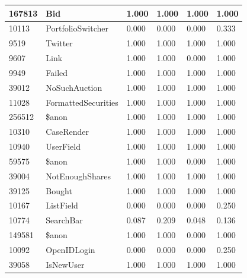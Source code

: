 \documentclass[a4paper]{article}
\newlength{\DUtablewidth} %
\begin{document}
\begin{longtable*}[c]{|p{0.160\DUtablewidth}|p{0.160\DUtablewidth}|p{0.160\DUtablewidth}|p{0.160\DUtablewidth}|p{0.160\DUtablewidth}|p{0.160\DUtablewidth}|}
167813
 & 
Bid
 & 
1.000
 & 
1.000
 & 
1.000
 & 
1.000
 \\
\hline

10113
 & 
PortfolioSwitcher
 & 
0.000
 & 
0.000
 & 
0.000
 & 
0.333
 \\
\hline

9519
 & 
Twitter
 & 
1.000
 & 
1.000
 & 
1.000
 & 
1.000
 \\
\hline

9607
 & 
Link
 & 
1.000
 & 
1.000
 & 
0.000
 & 
1.000
 \\
\hline

9949
 & 
Failed
 & 
1.000
 & 
1.000
 & 
1.000
 & 
1.000
 \\
\hline

39012
 & 
NoSuchAuction
 & 
1.000
 & 
1.000
 & 
1.000
 & 
1.000
 \\
\hline

11028
 & 
FormattedSecurities
 & 
1.000
 & 
1.000
 & 
1.000
 & 
1.000
 \\
\hline

256512
 & 
\$anon
 & 
1.000
 & 
1.000
 & 
1.000
 & 
1.000
 \\
\hline

10310
 & 
CaseRender
 & 
1.000
 & 
1.000
 & 
1.000
 & 
1.000
 \\
\hline

10940
 & 
UserField
 & 
1.000
 & 
1.000
 & 
1.000
 & 
1.000
 \\
\hline

59575
 & 
\$anon
 & 
1.000
 & 
1.000
 & 
0.000
 & 
1.000
 \\
\hline

39004
 & 
NotEnoughShares
 & 
1.000
 & 
1.000
 & 
1.000
 & 
1.000
 \\
\hline

39125
 & 
Bought
 & 
1.000
 & 
1.000
 & 
1.000
 & 
1.000
 \\
\hline

10167
 & 
ListField
 & 
0.000
 & 
0.000
 & 
0.000
 & 
0.250
 \\
\hline

10774
 & 
SearchBar
 & 
0.087
 & 
0.209
 & 
0.048
 & 
0.136
 \\
\hline

149581
 & 
\$anon
 & 
1.000
 & 
1.000
 & 
0.000
 & 
1.000
 \\
\hline

10092
 & 
OpenIDLogin
 & 
0.000
 & 
0.000
 & 
0.000
 & 
0.250
 \\
\hline

39058
 & 
IsNewUser
 & 
1.000
 & 
1.000
 & 
1.000
 & 
1.000
 \\
\hline


\end{longtable*}
\end{document}
